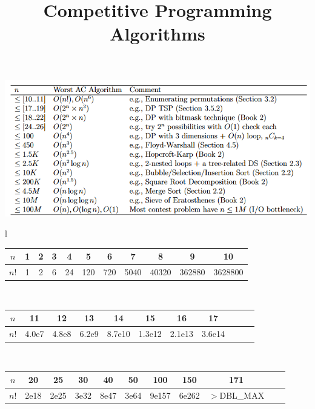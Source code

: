 \documentclass[11pt, letterpaper]{article}
\title{\vspace{-1cm}\bf Competitive Programming Algorithms}
\author{}
\date{}
\begin{document}
\maketitle
\tableofcontents

\begin{center}
    \includegraphics[scale=0.65]{assets/table.png}
\end{center}

\begin{center}
    \begin{tabular}{l}
        \begin{tabular}{c|c@{\ }c@{\ }c@{\ }c@{\ }c@{\ }c@{\ }c@{\ }c@{\ }c@{\ }c}
            $n$  & 1 & 2 & 3 & 4  & 5   & 6   & 7    & 8     & 9      & 10      \\
            \hline
            $n!$ & 1 & 2 & 6 & 24 & 120 & 720 & 5040 & 40320 & 362880 & 3628800 \\
        \end{tabular} \\
        \begin{tabular}{c|c@{\ }c@{\ }c@{\ }c@{\ }c@{\ }c@{\ }c@{\ }c@{\ }c@{\ }c}
            $n$  & 11    & 12    & 13    & 14     & 15     & 16     & 17     \\
            \hline
            $n!$ & 4.0e7 & 4.8e8 & 6.2e9 & 8.7e10 & 1.3e12 & 2.1e13 & 3.6e14 \\
        \end{tabular} \\
        \begin{tabular}{c|c@{\ }c@{\ }c@{\ }c@{\ }c@{\ }c@{\ }c@{\ }c@{\ }c@{\ }c}
            $n$  & 20   & 25   & 30   & 40   & 50   & 100   & 150   & 171                      \\
            \hline
            $n!$ & 2e18 & 2e25 & 3e32 & 8e47 & 3e64 & 9e157 & 6e262 & \scriptsize{$>$DBL\_MAX} \\
        \end{tabular}
    \end{tabular}
\end{center}
\end{document}
